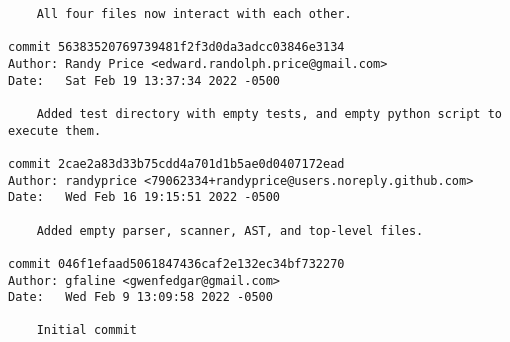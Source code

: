 {\begin{verbatim}
    All four files now interact with each other.

commit 56383520769739481f2f3d0da3adcc03846e3134
Author: Randy Price <edward.randolph.price@gmail.com>
Date:   Sat Feb 19 13:37:34 2022 -0500

    Added test directory with empty tests, and empty python script to execute them.

commit 2cae2a83d33b75cdd4a701d1b5ae0d0407172ead
Author: randyprice <79062334+randyprice@users.noreply.github.com>
Date:   Wed Feb 16 19:15:51 2022 -0500

    Added empty parser, scanner, AST, and top-level files.

commit 046f1efaad5061847436caf2e132ec34bf732270
Author: gfaline <gwenfedgar@gmail.com>
Date:   Wed Feb 9 13:09:58 2022 -0500

    Initial commit

\end{verbatim}
}
